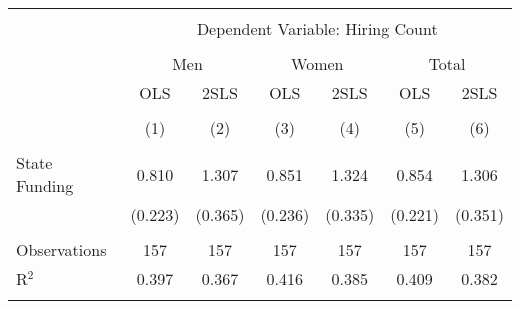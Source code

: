 
\begin{tabular}{@{\extracolsep{5pt}}lcccccc} 
\\[-1.8ex]\hline 
\hline \\[-1.8ex] 
 & \multicolumn{6}{c}{Dependent Variable: Hiring Count} \\ 
\cline{2-7} 
\\[-1.8ex] & \multicolumn{2}{c}{Men} & \multicolumn{2}{c}{Women} & \multicolumn{2}{c}{Total} \\ 
 & OLS & 2SLS & OLS & 2SLS & OLS & 2SLS \\ 
\\[-1.8ex] & (1) & (2) & (3) & (4) & (5) & (6)\\ 
\hline \\[-1.8ex] 
 State Funding & 0.810 & 1.307 & 0.851 & 1.324 & 0.854 & 1.306 \\ 
  & (0.223) & (0.365) & (0.236) & (0.335) & (0.221) & (0.351) \\ 
 \hline \\[-1.8ex] 
Observations & 157 & 157 & 157 & 157 & 157 & 157 \\ 
R$^{2}$ & 0.397 & 0.367 & 0.416 & 0.385 & 0.409 & 0.382 \\ 
\hline 
\hline \\[-1.8ex] 
\end{tabular} 
